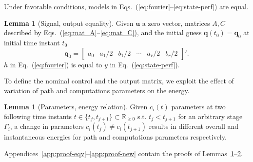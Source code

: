 \documentclass[letterpaper,10pt,journal,twoside]{IEEEtran}
\theoremstyle{definition}
\newtheorem{lem}[thm]{Lemma}
\begin{document}

Under favorable conditions, %
models in Eqs.~(\ref{eq:fourier}--\ref{eq:state-perf}) are equal.

\begin{lem}[Signal, output equality]\label{lem:eqv}Given $\mathbf{u}$ a zero vector, matrices $A,C$ described by Eqs.~(\ref{eq:mat_A}--\ref{eq:mat_C}), and the initial guess $\mathbf{q}(t_0)=\mathbf{q}_0$ at initial time instant $t_0$
  \begin{equation*}
  \mathbf{q}_0=\begin{bmatrix}a_0 & a_1/2 & b_1/2 & \cdots & a_r/2 & b_r/2\end{bmatrix}'.
  \end{equation*} 
  $h$ in Eq.~(\ref{eq:fourier}) is equal to $y$ in Eq.~(\ref{eq:state-perf}).
\end{lem}

To define the nominal control and the output matrix, we exploit the effect of variation of path and computations parameters on the energy. 

\begin{lem}[Parameters, energy relation]\label{lem:new}
  Given $c_i(t)$ parameters at two following time instants $t\in\{t_j,t_{j+1}\}\subset\mathbb{R}_{\geq 0}$ s.t. $t_j<t_{j+1}$ for an arbitrary stage $\Gamma_i$, a change in parameters $c_i(t_j)\neq c_i(t_{j+1})$ results in different overall and instantaneous energies for path and computations parameters respectively.
\end{lem}

Appendices~\ref{app:proof-eqv}--\ref{app:proof-new} contain the proofs of Lemmas~\ref{lem:eqv}--\hyperref[lem:new]{2}.
\end{document}
